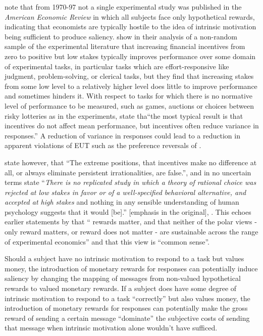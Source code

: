 \documentclass[../main.tex]{subfiles}
\begin{document}
\textcite[31]{Camerer1999} note that from 1970-97 not a single experimental study was published in the \textit{American Economic Review} in which all subjects face only hypothetical rewards, indicating that economists are typically hostile to the idea of intrinsic motivation being sufficient to produce saliency.
\textcite{Camerer1999} show in their analysis of a non-random sample of the experimental literature that increasing financial incentives from zero to positive but low stakes typically improves performance over some domain of experimental tasks, in particular tasks which are effort-responsive like judgment, problem-solving, or clerical tasks, but they find that increasing stakes from some low level to a relatively higher level does little to improve performance and sometimes hinders it.
With respect to tasks for which there is no normative level of performance to be measured, such as games, auctions or choices between risky lotteries as in the \textcite{Grether1979} experiments, \textcite[34]{Camerer1999} state tha\enquote{the most typical result is that incentives do not affect mean performance, but incentives often reduce variance in responses.}
A reduction of variance in responses could lead to a reduction in apparent violations of EUT such as the preference reversals of \textcite{Grether1979}.

\textcite[8]{Camerer1999} state however, that \enquote{The extreme positions, that  incentives make no difference at all, or always eliminate persistent irrationalities, are false.}, and in no uncertain terms state \enquote{\textit{There is no replicated study in which a theory of rational choice was rejected at low stakes in favor or of a well-specified behavioral alternative, and accepted at high stakes} \textelp{} and nothing in any sensible understanding of human psychology suggests that it would [be].} [emphasis in the original], \parencite*[33-34]{Camerer1999}.
This echoes earlier statements by \textcite[246]{Smith1993} that \enquote{\textelp{} rewards matter, and that neither of the polar views - only reward matters, or reward does not matter - are sustainable across the range of experimental economics} and that this view is \enquote{common sense}.

Should a subject have no intrinsic motivation to respond to a task but values money, the introduction of monetary rewards for responses can potentially induce saliency by changing the mapping of messages from non-valued hypothetical rewards to valued monetary rewards.
If a subject does have some degree of intrinsic motivation to respond to a task \enquote{correctly} but also values money, the introduction of monetary rewards for responses can potentially make the gross reward of sending a certain message \enquote{dominate} the subjective costs of sending that message when intrinsic motivation alone wouldn't have sufficed.
\end{document}
